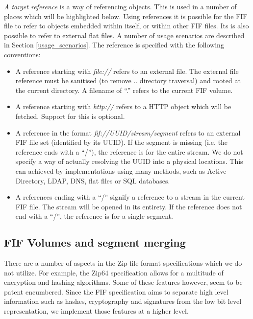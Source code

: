 \documentclass[10pt, conference]{IEEEtran}
\begin{document}
\label{target_reference}
{\em A target reference} is a way of referencing objects. This is used
in a number of places which will be highlighted below. Using
references it is possible for the FIF file to refer to objects
embedded within itself, or within other FIF files. Its is also
possible to refer to external flat files. A number of usage scenarios
are described in Section \ref{usage_scenarios}. The reference is
specified with the following conventions:

\begin{itemize}
\item A reference starting with {\em file://} refers to an external
file. The external file reference must be sanitised (to remove
.. directory traversal) and rooted at the current directory. A
filename of ``.'' refers to the current FIF volume.

\item A reference starting with {\em http://} refers to a HTTP
object which will be fetched. Support for this is optional.

\item A reference in the format {\em fif://UUID/stream/segment} refers
to an external FIF file set (identified by its UUID). If the segment
is missing (i.e. the reference ends with a ``/''), the reference is
for the entire stream. We do not specify a way of actually resolving
the UUID into a physical locations. This can achieved by
implementations using many methods, such as Active Directory, LDAP,
DNS, flat files or SQL databases.

\item A references ending with a ``/'' signify a reference to a
stream in the current FIF file. The stream will be opened in its
entirety. If the reference does not end with a ``/'', the reference is
for a single segment.
\end{itemize}

\subsection{FIF Volumes and segment merging}
There are a number of aspects in the Zip file format specifications
which we do not utilize. For example, the Zip64 specification allows
for a multitude of encryption and hashing algorithms. Some of these
features however, seem to be patent encumbered. Since the FIF
specification aims to separate high level information such as hashes,
cryptography and signatures from the low bit level representation, we
implement those features at a higher level.
\end{document}
